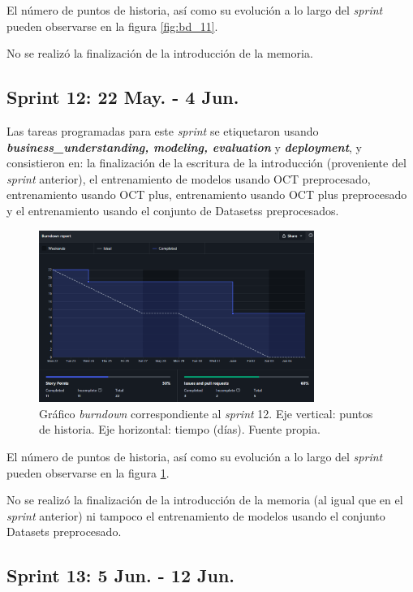 El número de puntos de historia, así como su evolución a lo largo del \textit{sprint} pueden observarse en la figura \ref{fig:bd_11}.

No se realizó la finalización de la introducción de la memoria.

\subsection{Sprint 12: 22 May. - 4 Jun.}

Las tareas programadas para este \textit{sprint} se etiquetaron usando \textbf{\textit{business\_understanding, modeling, evaluation}} y \textbf{\textit{deployment}}, y consistieron en: la finalización de la escritura de la introducción (proveniente del \textit{sprint} anterior), el entrenamiento de modelos usando OCT preprocesado, entrenamiento usando OCT plus, entrenamiento usando OCT plus preprocesado y el entrenamiento usando el conjunto de Datasetss preprocesados. 

\begin{figure}[h]
    \centering
    \includegraphics[width=0.8\textwidth]{img/bd_22may.png}
    \caption{Gráfico \textit{burndown} correspondiente al \textit{sprint} 12. Eje vertical: puntos de historia. Eje horizontal: tiempo (días). Fuente propia.}
    \label{fig:bd_12}
\end{figure}

El número de puntos de historia, así como su evolución a lo largo del \textit{sprint} pueden observarse en la figura \ref{fig:bd_12}.

No se realizó la finalización de la introducción de la memoria (al igual que en el \textit{sprint} anterior) ni tampoco el entrenamiento de modelos usando el conjunto Datasets preprocesado.

\subsection{Sprint 13: 5 Jun. - 12 Jun.}

